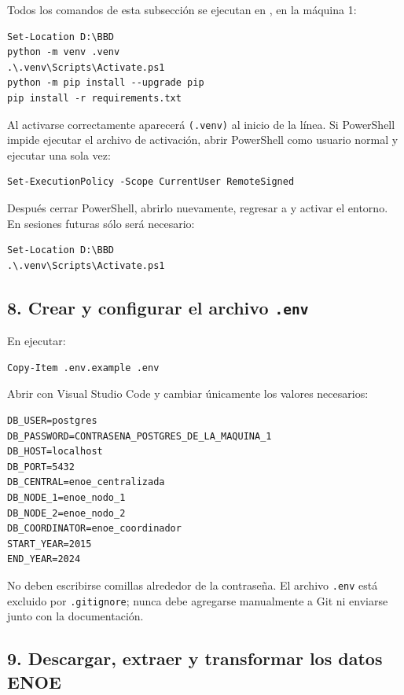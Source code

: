 \documentclass[12pt,letterpaper]{article}
\newcommand{\ruta}[1]{\texttt{\detokenize{#1}}}
\begin{document}
Todos los comandos de esta subsección se ejecutan en
\ruta{D:/BBD}, en la máquina 1:

\begin{lstlisting}
Set-Location D:\BBD
python -m venv .venv
.\.venv\Scripts\Activate.ps1
python -m pip install --upgrade pip
pip install -r requirements.txt
\end{lstlisting}

Al activarse correctamente aparecerá \texttt{(.venv)} al inicio de la línea.
Si PowerShell impide ejecutar el archivo de activación, abrir PowerShell como
usuario normal y ejecutar una sola vez:

\begin{lstlisting}
Set-ExecutionPolicy -Scope CurrentUser RemoteSigned
\end{lstlisting}

Después cerrar PowerShell, abrirlo nuevamente, regresar a \ruta{D:/BBD} y
activar el entorno. En sesiones futuras sólo será necesario:

\begin{lstlisting}
Set-Location D:\BBD
.\.venv\Scripts\Activate.ps1
\end{lstlisting}

\subsection{8. Crear y configurar el archivo \texttt{.env}}

En \ruta{D:/BBD} ejecutar:

\begin{lstlisting}
Copy-Item .env.example .env
\end{lstlisting}

Abrir \ruta{D:/BBD/.env} con Visual Studio Code y cambiar únicamente los
valores necesarios:

\begin{lstlisting}
DB_USER=postgres
DB_PASSWORD=CONTRASENA_POSTGRES_DE_LA_MAQUINA_1
DB_HOST=localhost
DB_PORT=5432
DB_CENTRAL=enoe_centralizada
DB_NODE_1=enoe_nodo_1
DB_NODE_2=enoe_nodo_2
DB_COORDINATOR=enoe_coordinador
START_YEAR=2015
END_YEAR=2024
\end{lstlisting}

No deben escribirse comillas alrededor de la contraseña. El archivo
\texttt{.env} está excluido por \texttt{.gitignore}; nunca debe agregarse
manualmente a Git ni enviarse junto con la documentación.

\subsection{9. Descargar, extraer y transformar los datos ENOE}
\end{document}
